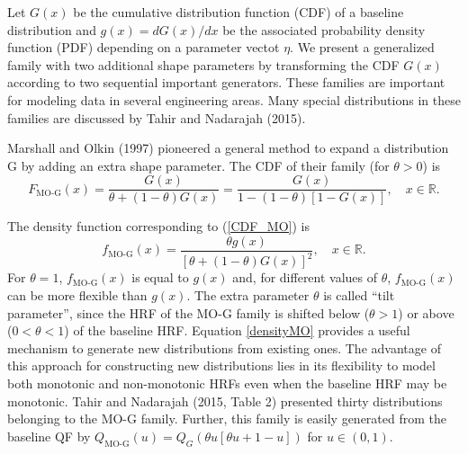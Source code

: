 \documentclass[12pt,a4paper]{article} %
\begin{document}
Let $G(x)$ be the cumulative distribution function (CDF) of a
baseline distribution and $g(x)=dG(x)/dx$ be the associated
probability density function (PDF) depending on a parameter vectot $\eta$. We present a generalized family
with two additional shape parameters by transforming the CDF $G(x)$
according to two sequential important gene\-rators. These families are important for modeling data
in several engineering areas. Many special distributions in these families are discussed by Tahir
and Nadarajah (2015).


Marshall and Olkin (1997) pioneered a general method to expand
a distribution G by adding an extra shape parameter.
The CDF of their family (for $\theta>0$) is
\begin{equation}\label{CDF_MO}
F_{\text{MO-G}}(x)=\frac{G(x)}{\theta+(1-\theta)G(x)}=\frac{G(x)}{1-(1-\theta)[1-G(x)]},\quad x \in \mathbb{R}.
\end{equation}

The density function corresponding to (\ref{CDF_MO}) is
\begin{equation}\label{densityMO}
f_{\text{MO-G}}(x)=\frac{\theta g(x)}{[\theta+(1-\theta)G(x)]^{2}},\quad x \in \mathbb{R}.
\end{equation}
For $\theta = 1$, $f_{\text{MO-G}}(x)$ is equal to $g(x)$ and, for different values of
$\theta$, $f_{\text{MO-G}}(x)$ can be more flexible than $g(x)$.
The extra parameter $\theta$ is called ``tilt parameter'', since
the HRF of the MO-G family is shifted below ($\theta> 1$)
or above ($0<\theta<1$) of the baseline HRF. Equation \eqref{densityMO} provides a useful
mechanism to generate new distributions from existing ones. The advantage of this approach
for constructing new distributions lies in its flexibility to model
both monotonic and non-monotonic HRFs even when the baseline HRF may be
monotonic. Tahir and Nadarajah (2015, Table 2) presented thirty distributions belonging to
the $\text{MO-G}$ family. Further, this family is easily generated from the baseline QF by
$Q_{\text{MO-G}}(u)=Q_{G}\left(\theta u \left[\theta u+1-u\right]\right)$ for $u\in(0,1)$.
\end{document}
